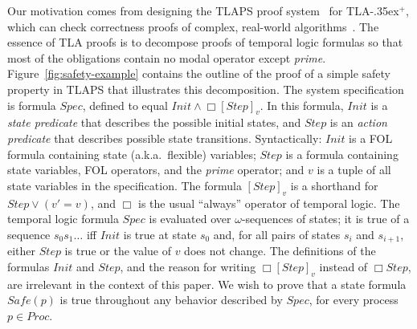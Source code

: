 \documentclass{easychair}
\renewcommand{\implies}{\Rightarrow}
\newcommand{\tlaplus}{\mbox{TLA\kern -.35ex$^+$}\xspace}
\newcommand{\edmargin}[2]{\marginpar{\raggedright\footnotesize\color{red}#1: #2}}
\newcommand{\edmargin}[2]{}
\def\llmargin{\edmargin{LL}}
\def\smmargin{\edmargin{SM}}
\begin{document}
Our motivation comes from designing the TLAPS proof
system~\cite{cousineau:tlaps} for \tlaplus, which can check
correctness proofs of complex, real-world algorithms~\cite{lamport:byzantizing}.
The essence of TLA proofs is to decompose proofs of temporal logic formulas
so that most of the obligations
contain no modal operator except \emph{prime}. Figure~\ref{fig:safety-example}
contains the outline of the proof of a simple safety property in TLAPS that
illustrates this decomposition. The system
specification is formula $Spec$, defined to equal
  $Init \land \Box[Step]_v$.
In this formula, $Init$ is a \emph{state predicate} that describes the possible
initial states, and $Step$ is an \emph{action predicate} that describes
possible state transitions. Syntactically: $Init$ is a FOL formula containing
state (a.k.a.\ flexible) variables; $Step$ is a formula containing state
variables, FOL operators, and the \emph{prime} operator; and
$v$ is a tuple of all state variables in the specification.
The formula $[Step]_v$ is a shorthand for $Step \lor (v'=v)$, and $\Box$ is the
usual ``always'' operator of temporal logic.
%
%
The temporal logic formula $Spec$ is evaluated over $\omega$-sequences of
states; it is true of a sequence $s_0 s_1 \ldots$ iff $Init$ is true at state
$s_0$ and, for all pairs of states $s_i$ and $s_{i+1}$, either $Step$ is true
or the value of $v$ does not change. The definitions of the formulas $Init$ and
$Step$, and the reason for writing $\Box[Step]_v$ instead
of $\Box Step$, are irrelevant in the context of this paper.
%
%
We wish to prove that a state formula $Safe(p)$ is true throughout any behavior
described by $Spec$, for every process $p \in Proc$.
%

\end{document}
